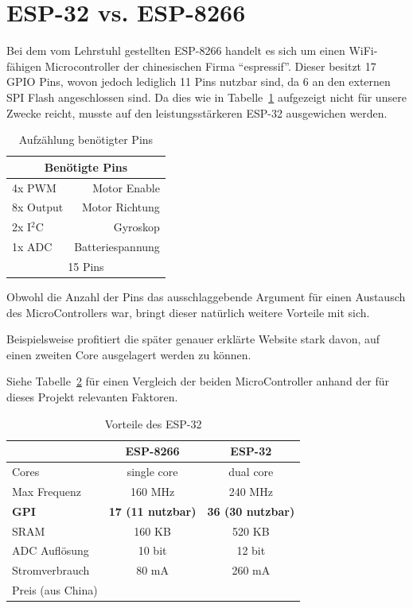 \section{ESP-32 vs. ESP-8266}
Bei dem vom Lehrstuhl gestellten ESP-8266 handelt es sich um einen WiFi-fähigen Microcontroller der chinesischen Firma ``espressif''.
Dieser besitzt 17 GPIO Pins, wovon jedoch lediglich 11 Pins nutzbar sind, da 6 an den externen SPI Flash angeschlossen sind.
Da dies wie in Tabelle~\ref{table:pins} aufgezeigt nicht für unsere Zwecke reicht, musste auf den leistungsstärkeren ESP-32 ausgewichen werden.

\begin{table}[!ht]
\centering
\begin{tabular}{lr}
	\multicolumn{2}{c}{Benötigte Pins} \\ 
	\midrule[3pt] 
	4x PWM & Motor Enable \\ 
	\midrule 
	8x Output & Motor Richtung \\ 
	\midrule 
	2x I$^2$C & Gyroskop \\ 
	\midrule 
	1x ADC & Batteriespannung \\ 
	\midrule
	\midrule 
	\multicolumn{2}{c}{15 Pins} \\ 
	 
\end{tabular} 
\caption{Aufzählung benötigter Pins} 
\label{table:pins}
\end{table} 

Obwohl die Anzahl der Pins das ausschlaggebende Argument für einen Austausch des MicroControllers war, bringt dieser natürlich weitere Vorteile mit sich.

Beispielsweise profitiert die später genauer erklärte Website stark davon, auf einen zweiten Core ausgelagert werden zu können.

Siehe Tabelle~\ref{table:esp32} für einen Vergleich der beiden MicroController anhand der für dieses Projekt relevanten Faktoren.


\begin{table}[!ht]
\centering	
\begin{tabular}{lcc}
	& ESP-8266 & ESP-32 \\ 
	\midrule[3pt]
	Cores & single core & dual core \\ 
	\midrule
	Max Frequenz & 160 MHz & 240 MHz \\ 
	\midrule 
	\textbf{GPI} & \textbf{17 (11 nutzbar)} & \textbf{36 (30 nutzbar)} \\ 
	\midrule
	SRAM & 160 KB & 520 KB \\ 
	\midrule
	ADC Auflösung & 10 bit & 12 bit \\ 
	\midrule
	Stromverbrauch & 80 mA & 260 mA \\ 
	\midrule
	Preis (aus China) & \EUR{2} & \EUR{4} \\ 
\end{tabular} 
\caption{Vorteile des ESP-32} 
\label{table:esp32}
\end{table} 


